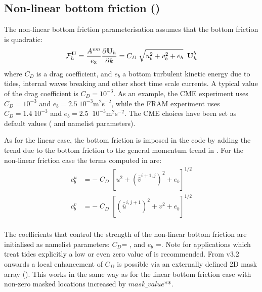 \documentclass[../tex_main/NEMO_manual]{subfiles}
\begin{document}
\subsection{Non-linear bottom friction (\protect{})}
\label{subsec:ZDF_bfr_nonlinear}

The non-linear bottom friction parameterisation assumes that the bottom 
friction is quadratic: 
\begin{equation} \label{eq:zdfbfr_nonlinear}
{\cal F}_h^\textbf{U} = \frac{A^{vm}}{e_3 }\frac{\partial \textbf {U}_h 
}{\partial k}=C_D \;\sqrt {u_b ^2+v_b ^2+e_b } \;\; \textbf {U}_h^b 
\end{equation}
where $C_D$ is a drag coefficient, and $e_b $ a bottom turbulent kinetic energy 
due to tides, internal waves breaking and other short time scale currents. 
A typical value of the drag coefficient is $C_D = 10^{-3} $. As an example, 
the CME experiment \citep{Treguier_JGR92} uses $C_D = 10^{-3}$ and 
$e_b = 2.5\;10^{-3}$m$^2$\;s$^{-2}$, while the FRAM experiment \citep{Killworth1992} 
uses $C_D = 1.4\;10^{-3}$ and $e_b =2.5\;\;10^{-3}$m$^2$\;s$^{-2}$. 
The CME choices have been set as default values ( and  
namelist parameters).

As for the linear case, the bottom friction is imposed in the code by 
adding the trend due to the bottom friction to the general momentum trend 
in .
For the non-linear friction case the terms
computed in   are: 
\begin{equation} \label{eq:zdfbfr_nonlinbfr}
\begin{split}
 c_b^u &= - \; C_D\;\left[ u^2 + \left(\bar{\bar{v}}^{i+1,j}\right)^2 + e_b \right]^{1/2}\\
 c_b^v &= - \; C_D\;\left[  \left(\bar{\bar{u}}^{i,j+1}\right)^2 + v^2 + e_b \right]^{1/2}\\
\end{split}
\end{equation}

The coefficients that control the strength of the non-linear bottom friction are
initialised as namelist parameters: $C_D$= , and $e_b$ =.
Note for applications which treat tides explicitly a low or even zero value of
 is recommended. From v3.2 onwards a local enhancement of $C_D$ is possible
via an externally defined 2D mask array ().  This works in the same way
as for the linear bottom friction case with non-zero masked locations increased by
$mask\_value$**.
\end{document}
